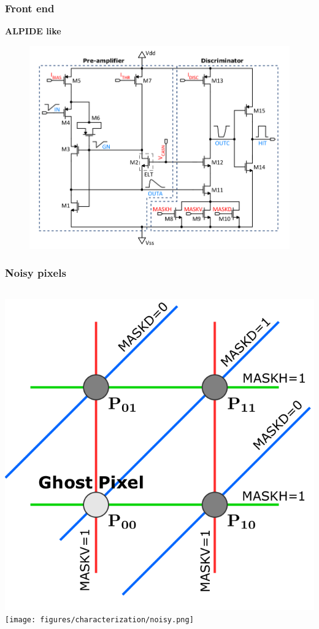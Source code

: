     \begin{frame}
        \frametitle{Front end}
            \textbf{ALPIDE like}
            \begin{figure}[h!]
                \centering
                \includegraphics[width=.8\linewidth]{figures/Monopix1/Monopix1_FE_circuit.png}        
            \end{figure}
    \end{frame}     


    \begin{frame}
        \frametitle{Noisy pixels}
        \begin{columns}
                \centering
                \includegraphics[width=.8\linewidth]{figures/Monopix1/masking_scheme.png}        
            \texttt{[image: figures/characterization/noisy.png]}
        \end{columns}
    \end{frame}    


